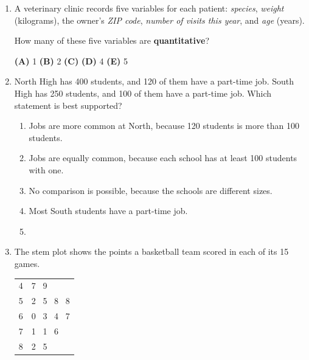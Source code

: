 \documentclass[12pt]{article}
\begin{document}
\begin{enumerate}[leftmargin=1.9em, itemsep=0.13in]

  \boxguard[8]
  \item A veterinary clinic records five variables for each patient: \emph{species},
        \emph{weight} (kilograms), the owner's \emph{ZIP code}, \emph{number of visits this
        year}, and \emph{age} (years).

        How many of these five variables are \textbf{quantitative}?\hfill{}\rule[-0.2in]{0pt}{0.48in}
        \par\vspace{3pt}\noindent
        \hspace{1.2em}\textbf{(A)} 1 \hfill \textbf{(B)} 2 \hfill
        \textbf{(C)}  \hfill \textbf{(D)} 4 \hfill \textbf{(E)} 5

  \boxguard[11]
  \item North High has 400 students, and 120 of them have a part-time job. South High has 250
        students, and 100 of them have a part-time job. Which statement is best supported?
        \begin{enumerate}[label=\textbf{(\Alph*)}, leftmargin=2.2em, itemsep=2pt]
          \item Jobs are more common at North, because 120 students is more than 100 students.
          \item Jobs are equally common, because each school has at least 100 students with one.
          \item No comparison is possible, because the schools are different sizes.
          \item Most South students have a part-time job.
          \item {}\\
                \hfill{}\rule[-0.2in]{0pt}{0.48in}
        \end{enumerate}

  \boxguard[13]
  \item The stem plot shows the points a basketball team scored in each of its 15 games.

        \vspace{3pt}
        {\centering\small
        \renewcommand{\arraystretch}{1.05}
        \begin{tabular}{@{} r | l @{}}
        4 & 7 \ 9 \\
        5 & 2 \ 5 \ 8 \ 8 \\
        6 & 0 \ 3 \ 4 \ 7 \\
        7 & 1 \ 1 \ 6 \\
        8 & 2 \ 5 \\
        \end{tabular}\qquad
        \par}
        \vspace{2pt}


\end{enumerate}
\end{document}
